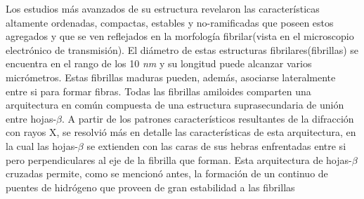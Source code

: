 Los estudios más avanzados de su estructura revelaron las características altamente ordenadas, compactas, estables y no-ramificadas que poseen estos agregados y que se ven reflejados en
la morfología fibrilar(vista en el microscopio electrónico de transmisión).
El diámetro de estas estructuras fibrilares(fibrillas) se encuentra en el rango de los 10 \textit{nm} y su longitud puede alcanzar varios micrómetros. 
Estas fibrillas maduras pueden, además, asociarse lateralmente entre si para formar fibras.
Todas las fibrillas amiloides comparten una arquitectura en común compuesta de una estructura suprasecundaria de unión entre hojas-$\beta$.
A partir de los patrones característicos resultantes de la difracción con rayos X, se resolvió más en detalle las características de esta arquitectura, en la cual 
las hojas-$\beta$ se extienden con las caras de sus hebras enfrentadas entre si pero perpendiculares al eje de la fibrilla que forman\cite{nelson2005structure}.  
Esta arquitectura de hojas-$\beta$ cruzadas permite, como se mencionó antes, la formación de un continuo de puentes de hidrógeno que proveen de gran estabilidad a las fibrillas 





% 

